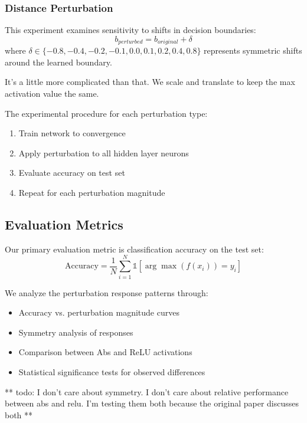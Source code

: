 \subsubsection{Distance Perturbation}
This experiment examines sensitivity to shifts in decision boundaries:
\begin{equation}
    b_{perturbed} = b_{original} + \delta
\end{equation}
where $\delta \in \{-0.8, -0.4, -0.2, -0.1, 0.0, 0.1, 0.2, 0.4, 0.8\}$ represents symmetric shifts around the learned boundary.

It's a little more complicated than that. We scale and translate to keep the max activation value the same.

The experimental procedure for each perturbation type:
\begin{enumerate}
    \item Train network to convergence
    \item Apply perturbation to all hidden layer neurons
    \item Evaluate accuracy on test set
    \item Repeat for each perturbation magnitude
\end{enumerate}

\subsection{Evaluation Metrics}

Our primary evaluation metric is classification accuracy on the test set:
\begin{equation}
    \text{Accuracy} = \frac{1}{N}\sum_{i=1}^N \mathbb{1}[\arg\max(f(x_i)) = y_i]
\end{equation}

We analyze the perturbation response patterns through:
\begin{itemize}
    \item Accuracy vs. perturbation magnitude curves
    \item Symmetry analysis of responses
    \item Comparison between Abs and ReLU activations
    \item Statistical significance tests for observed differences
\end{itemize}

** todo: I don't care about symmetry. I don't care about relative performance between abs and relu. I'm testing them both because the original paper discusses both ** 

